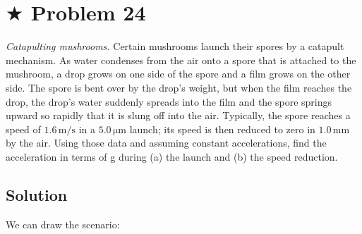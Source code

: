 \documentclass{article}
\begin{document}
\section{$\bigstar$ Problem 24}
\emph{Catapulting mushrooms.} Certain mushrooms launch
their spores by a catapult mechanism. As water condenses from
the air onto a spore that is attached to the mushroom, a drop grows
on one side of the spore and a film grows on the other side. The
spore is bent over by the drop’s weight, but when the film reaches
the drop, the drop’s water suddenly spreads into the film and the
spore springs upward so rapidly that it is slung off into the air. Typically, 
the spore reaches a speed of $1.6\,\mathrm{m/s}$ in a $5.0\,\mathrm{\mu m}$ launch; 
its speed is then reduced to zero in $1.0\,\mathrm{mm}$ by the air. Using those data
and assuming constant accelerations, find the acceleration in terms
of g during (a) the launch and (b) the speed reduction.

\subsection{Solution}
We can draw the scenario:
\begin{figure}[H]
    \begin{center}
    \end{center}
\end{figure}
\end{document}
